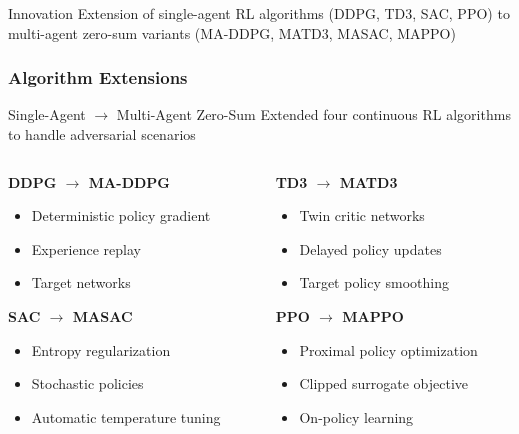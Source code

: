 \documentclass[
    11pt, %
    aspectratio=169, %
]{beamer}
\begin{document}
\begin{frame}
	\begin{exampleblock}{Innovation}
		Extension of single-agent RL algorithms (DDPG, TD3, SAC, PPO) to multi-agent zero-sum variants (MA-DDPG, MATD3, MASAC, MAPPO)
	\end{exampleblock}
\end{frame}

\begin{frame}
	\frametitle{Algorithm Extensions}
	
	\begin{block}{Single-Agent $\rightarrow$ Multi-Agent Zero-Sum}
		Extended four continuous RL algorithms to handle adversarial scenarios
	\end{block}
	
	\begin{columns}[t]
		\begin{column}{0.5\textwidth}
			\textbf{DDPG $\rightarrow$ MA-DDPG}
			\begin{itemize}
				\item Deterministic policy gradient
				\item Experience replay
				\item Target networks
			\end{itemize}
			
			\vspace{0.3cm}
			\textbf{SAC $\rightarrow$ MASAC}
			\begin{itemize}
				\item Entropy regularization
				\item Stochastic policies
				\item Automatic temperature tuning
			\end{itemize}
		\end{column}
		\begin{column}{0.5\textwidth}
			\textbf{TD3 $\rightarrow$ MATD3}
			\begin{itemize}
				\item Twin critic networks
				\item Delayed policy updates
				\item Target policy smoothing
			\end{itemize}
			
			\vspace{0.3cm}
			\textbf{PPO $\rightarrow$ MAPPO}
			\begin{itemize}
				\item Proximal policy optimization
				\item Clipped surrogate objective
				\item On-policy learning
			\end{itemize}
		\end{column}
	\end{columns}
\end{frame}
\end{document}
